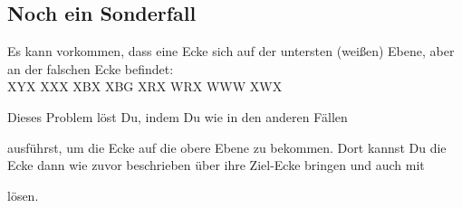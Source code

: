\subsection{Noch ein Sonderfall}
Es kann vorkommen, dass eine Ecke sich auf der untersten (weißen) Ebene, aber an der falschen Ecke befindet:\\[1em]

\RubikCubeGreyAll%
            {X}{Y}{X}
            {X}{X}{X}%
               {X}{B}{X}
	       {X}{B}{G}%
	       {X}{R}{X}
	       {W}{R}{X}%
	      {W}{W}{W}
	      {X}{W}{X}%

Dieses Problem löst Du, indem Du wie in den anderen Fällen
\begin{center}
\end{center}
ausführst, um die Ecke auf die obere Ebene zu bekommen.
Dort kannst Du die Ecke dann wie zuvor beschrieben über ihre Ziel-Ecke bringen und auch mit
\begin{center}
\end{center}
lösen.

\pagebreak
